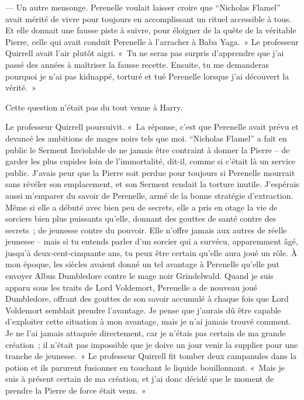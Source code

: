 --- Un autre mensonge.
Perenelle voulait laisser croire que “Nicholas Flamel” avait mérité de vivre pour toujours en accomplissant un rituel accessible à tous.
Et elle donnait une fausse piste à suivre, pour éloigner de la quête de la véritable Pierre, celle qui avait conduit Perenelle à l'arracher à Baba Yaga.~»
Le professeur Quirrell avait l'air plutôt aigri.
«~Tu ne seras pas surpris d'apprendre que j'ai passé des années à maîtriser la fausse recette.
Ensuite, tu me demanderas pourquoi je n'ai pas kidnappé, torturé et tué Perenelle lorsque j'ai découvert la vérité.~»

Cette question n'était pas du tout venue à Harry.

Le professeur Quirrell poursuivit.
«~La réponse, c'est que Perenelle avait prévu et devancé les ambitions de mages noirs tels que moi.
“Nicholas Flamel” a fait en public le Serment Inviolable de ne jamais être contraint à donner la Pierre -- de garder les plus cupides loin de l'immortalité, dit-il, comme si c'était là un service public.
J'avais peur que la Pierre soit perdue pour toujours si Perenelle mourrait sans révéler son emplacement, et son Serment rendait la torture inutile.
J'espérais aussi m'emparer du savoir de Perenelle, armé de la bonne stratégie d'extraction.
Même si elle a débuté avec bien peu de secrets, elle a pris en otage la vie de sorciers bien plus puissants qu'elle, donnant des gouttes de santé contre des secrets~; de jeunesse contre du pouvoir.
Elle n'offre jamais aux autres de réelle jeunesse -- mais si tu entends parler d'un sorcier qui a survécu, apparemment âgé, jusqu'à deux-cent-cinquante ans, tu peux être certain qu'elle aura joué un rôle.
À mon époque, les siècles avaient donné un tel avantage à Perenelle qu'elle put envoyer Albus Dumbledore contre le mage noir Grindelwald.
Quand je suis apparu sous les traits de Lord Voldemort, Perenelle a de nouveau joué Dumbledore, offrant des gouttes de son savoir accumulé à chaque fois que Lord Voldemort semblait prendre l'avantage.
Je pense que j'aurais dû être capable d'exploiter cette situation à mon avantage, mais je n'ai jamais trouvé comment.
Je ne l'ai jamais attaquée directement, car je n'étais pas certain de ma grande création~; il n'était pas impossible que je doive un jour venir la supplier pour une tranche de jeunesse.~»
Le professeur Quirrell fit tomber deux campanules dans la potion et ils parurent fusionner en touchant le liquide bouillonnant.
«~Mais je suis à présent certain de ma création, et j'ai donc décidé que le moment de prendre la Pierre de force était venu.~»

